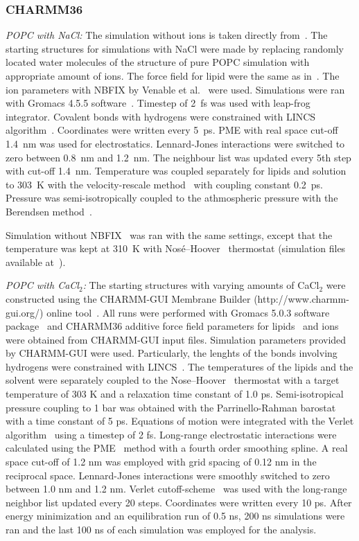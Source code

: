 \documentclass[twoside,twocolumn,9pt]{article}
\begin{document}
\subsubsection{CHARMM36}
{\it POPC with NaCl:}
The simulation without ions is taken directly from~\cite{botan15,charmm36filesSHORT}. 
The starting structures for simulations with NaCl were made by replacing randomly located 
water molecules of the structure of pure POPC simulation with appropriate amount of ions.
The force field for lipid were the same as in~\cite{botan15,charmm36filesSHORT}.
The ion parameters with NBFIX by Venable et al.~\cite{venable13} were used.
Simulations were ran with Gromacs 4.5.5 software~\cite{pronk13}.
Timestep of 2~fs was used with leap-frog integrator. Covalent bonds with hydrogens were constrained with LINCS algorithm~\cite{hess97,hess07}. 
Coordinates were written every 5~ps. PME with real space cut-off 1.4~nm was used 
for electrostatics. Lennard-Jones interactions were switched to zero between 0.8~nm and 1.2~nm.
The neighbour list was updated every 5th step with cut-off 1.4~nm. Temperature was coupled separately
for lipids and solution to 303~K with the velocity-rescale method~\cite{bussi07} with coupling constant 0.2~ps.
Pressure was semi-isotropically coupled to the athmospheric pressure with the Berendsen method~\cite{berendsen84}.

Simulation without NBFIX~\cite{venable13} was ran with the same settings, except that 
the temperature was kept at 310~K with Nos{\'e}--Hoover~\cite{nose84,hoover85} thermostat 
(simulation files available at~\cite{charmmPOPC350mMNaClnoNBFIXfiles}). 

{\it POPC with CaCl$_2$:}
The starting structures with varying amounts of CaCl$_2$ were constructed using the CHARMM-GUI Membrane Builder (http://www.charmm-gui.org/) online tool~\cite{lee15}. 
All runs were performed with Gromacs 5.0.3 software package~\cite{abraham15} and CHARMM36 additive force field parameters for lipids~\cite{klauda10} and ions were obtained from CHARMM-GUI input files. 
Simulation parameters provided by CHARMM-GUI were used.
Particularly, the lenghts of the bonds involving hydrogens were constrained with LINCS~\cite{hess97,hess07}. The temperatures of the 
lipids and the solvent were separately coupled to the Nose--Hoover~\cite{nose84,hoover85} thermostat with a target temperature of 303 K and a relaxation time constant of 1.0 ps. Semi-isotropical 
pressure coupling to 1 bar was obtained with the Parrinello-Rahman barostat~\cite{parrinello81} with a time constant of 5 ps. Equations of motion were integrated with the Verlet algorithm~\cite{pall13} 
using a timestep of 2 fs. Long-range electrostatic interactions were calculated using the PME~\cite{darden93,essman95} method with a fourth order smoothing spline. A real space cut-off of 1.2 nm 
was employed with grid spacing of 0.12 nm in the reciprocal space. Lennard-Jones interactions were smoothly switched to zero between 1.0 nm and 1.2 nm. Verlet cutoff-scheme~\cite{pall13}  
was used with the long-range neighbor list updated every 20 steps. Coordinates were written every 10 ps.
After energy minimization and an equilibration run of 0.5 ns, 200 ns simulations were ran and the last 100 ns of each simulation was employed for the analysis.
\end{document}
